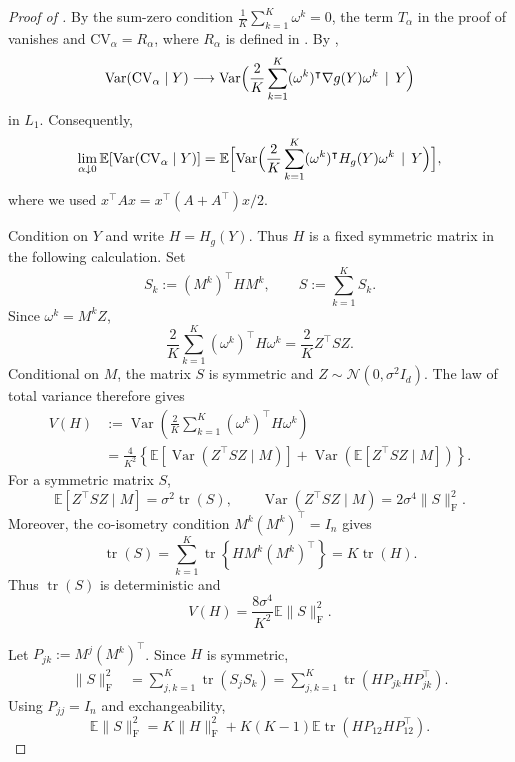 \documentclass[10pt,a4paper]{amsart}
\def\calN{\mathcal{N}}
\newcommand{\cv}{{\mathrm{CV}}}
\newcommand{\tran}{^\intercal}
\begin{document}
\begin{proof}[Proof of ]
By the sum-zero condition $\frac1K\sum_{k=1}^K\omega^k=0$,
the term $T_\alpha$ in the proof of
 vanishes and $\cv_\alpha=R_\alpha$, where $R_\alpha$ 
is defined in . By
,
\[
\operatorname{Var}(\cv_\alpha\mid Y)
\longrightarrow
\operatorname{Var}\Bigl(
\frac2K\sum_{k=1}^K
(\omega^k)\tran\nabla g(Y)\omega^k
\, \mid \,Y
\Bigr)
\]
in $L_1$. Consequently,
\begin{align}
\lim_{\alpha\downarrow0}
\mathbb E\!\left[
\operatorname{Var}(\cv_\alpha\mid Y)
\right]
=
\mathbb E\Bigl[
\operatorname{Var}\Bigl(
\frac2K\sum_{k=1}^K
(\omega^k)\tran H_g(Y)\omega^k
\,\mid \,Y
\Bigr)
\Bigr],
\label{equ:rvar:limit}
\end{align}
where we used $x^\top A x=x^\top(A+A^\top)x/2$.

Condition on $Y$ and write $H=H_g(Y)$. Thus $H$ is a fixed symmetric
matrix in the following calculation. Set
\[
S_k:=(M^k)\tran H M^k,
\qquad
S:=\sum_{k=1}^KS_k.
\]
Since $\omega^k=M^kZ$,
\[
\frac2K\sum_{k=1}^K(\omega^k)\tran H\omega^k
=
\frac2K Z\tran S Z.
\]
Conditional on $M$, the matrix $S$ is symmetric and
$Z\sim\calN(0,\sigma^2I_d)$. The law of total variance therefore gives
\begin{align*}
V(H)
&:=
\operatorname{Var}\left(
\frac2K\sum_{k=1}^K(\omega^k)\tran H\omega^k
\right)\\
&=
\frac4{K^2}
\left\{
\mathbb E\!\left[
\operatorname{Var}(Z\tran S Z\mid M)
\right]
+
\operatorname{Var}\left(
\mathbb E[Z\tran S Z\mid M]
\right)
\right\}.
\end{align*}
For a symmetric matrix $S$,
\[
\mathbb E[Z\tran S Z\mid M]
=
\sigma^2\operatorname{tr}(S),
\qquad
\operatorname{Var}(Z\tran S Z\mid M)
=
2\sigma^4\|S\|_{\mathrm F}^2.
\]
Moreover, the co-isometry condition
$M^k(M^k)\tran=I_n$ gives
\[
\operatorname{tr}(S)
=
\sum_{k=1}^K
\operatorname{tr}\left\{
H M^k(M^k)\tran
\right\}
=
K\operatorname{tr}(H).
\]
Thus $\operatorname{tr}(S)$ is deterministic and
\begin{equation}
V(H)
=
\frac{8\sigma^4}{K^2}
\mathbb E\|S\|_{\mathrm F}^2.
\label{eq:V-corrected}
\end{equation}

Let $P_{jk}:=M^j(M^k)\tran$.
Since $H$ is symmetric,
\begin{align*}
\|S\|_{\mathrm F}^2
&=
\sum_{j,k=1}^K\operatorname{tr}(S_jS_k)=
\sum_{j,k=1}^K
\operatorname{tr}
\left(
H P_{jk}H P_{jk}\tran
\right).
\end{align*}
Using $P_{jj}=I_n$ and exchangeability,
\begin{equation}
\mathbb E\|S\|_{\mathrm F}^2
=
K\|H\|_{\mathrm F}^2
+
K(K-1)
\mathbb E\operatorname{tr}
\left(
H P_{12}H P_{12}\tran
\right).
\label{eq:S2-corrected}
\end{equation}


\end{proof}
\end{document}
